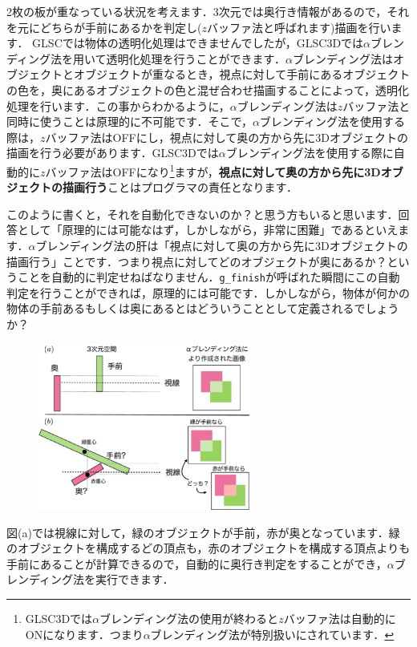 \documentclass[platex,a4paper,12pt]{jsarticle}%
\begin{document}
2枚の板が重なっている状況を考えます．3次元では奥行き情報があるので，それを元にどちらが手前にあるかを判定し($z$バッファ法と呼ばれます)描画を行います．
GLSCでは物体の透明化処理はできませんでしたが，GLSC3Dでは$\alpha$ブレンディング法を用いて透明化処理を行うことができます．$\alpha$ブレンディング法はオブジェクトとオブジェクトが重なるとき，視点に対して手前にあるオブジェクトの色を，奥にあるオブジェクトの色と混ぜ合わせ描画することによって，透明化処理を行います．この事からわかるように，$\alpha$ブレンディング法は$z$バッファ法と同時に使うことは原理的に不可能です．そこで，$\alpha$ブレンディング法を使用する際は，$z$バッファ法はOFFにし，視点に対して奥の方から先に3Dオブジェクトの描画を行う必要があります．GLSC3Dでは$\alpha$ブレンディング法を使用する際に自動的に$z$バッファ法はOFFになり\footnote{GLSC3Dでは$\alpha$ブレンディング法の使用が終わると$z$バッファ法は自動的にONになります．つまり$\alpha$ブレンディング法が特別扱いにされています．}ますが，{\bf 視点に対して奥の方から先に3Dオブジェクトの描画行う}ことはプログラマの責任となります．

このように書くと，それを自動化できないのか？と思う方もいると思います．回答として「原理的には可能なはず，しかしながら，非常に困難」であるといえます．$\alpha$ブレンディング法の肝は「視点に対して奥の方から先に3Dオブジェクトの描画行う」ことです．つまり視点に対してどのオブジェクトが奥にあるか？ということを自動的に判定せねばなりません．\verb|g_finish|が呼ばれた瞬間にこの自動判定を行うことができれば，原理的には可能です．しかしながら，物体が何かの物体の手前あるもしくは奥にあるとはどういうこととして定義されるでしょうか？

\begin{figure}
\vspace{-1\baselineskip}
	\includegraphics[width=70mm]{./Figures/eps/005.eps}
\end{figure}

図(a)では視線に対して，緑のオブジェクトが手前，赤が奥となっています．緑のオブジェクトを構成するどの頂点も，赤のオブジェクトを構成する頂点よりも手前にあることが計算できるので，自動的に奥行き判定をすることができ，$\alpha$ブレンディング法を実行できます．
\end{document}
